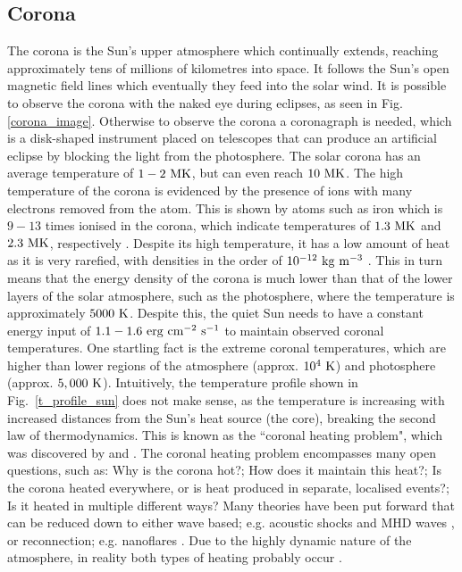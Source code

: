 \subsection{Corona}
\label{ssec:corona}
The corona is the Sun's upper atmosphere which continually extends, reaching approximately tens of millions of kilometres into space. It follows the Sun's open magnetic field lines which eventually they feed into the solar wind. It is possible to observe the corona with the naked eye during eclipses, as seen in Fig. \ref{corona_image}. Otherwise to observe the corona a coronagraph is needed, which is a disk-shaped instrument placed on telescopes that can produce an artificial eclipse by blocking the light from the photosphere. The solar corona has an average temperature of $1-2~\rm{MK}$, but can even reach $10~\rm{MK}$. The high temperature of the corona is evidenced by the presence of ions with many electrons removed from the atom. This is shown by atoms such as iron which is $9-13$ times ionised in the corona, which indicate temperatures of $1.3~\rm{MK}$ and $2.3~\rm{MK}$, respectively \citep{Grotrian1939,Edl1943}. Despite its high temperature, it has a low amount of heat as it is very rarefied, with densities in the order of $10^{-12}~\rm{kg~m^{-3}}$ \citep{priest2014magnetohydrodynamics}. This in turn means that the energy density of the corona is much lower than that of the lower layers of the solar atmosphere, such as the photosphere, where the temperature is approximately $5000~\rm{K}$. Despite this, the quiet Sun needs to have a constant energy input of $1.1-1.6~\rm{erg~cm^{-2}~s^{-1}}$ \citep{Sakurai2017PJAB9387S} to maintain observed coronal temperatures. \np
%
One startling fact is the extreme coronal temperatures, which are higher than lower regions of the atmosphere (approx. $10^4~\rm{K}$) and photosphere (approx. $5,000~\rm{K}$). Intuitively, the temperature profile shown in Fig.~\ref{t_profile_sun} does not make sense, as the temperature is increasing with increased distances from the Sun's heat source (the core), breaking the second law of thermodynamics. This is known as the ``coronal heating problem", which was discovered by \cite{Grotrian1939} and \cite{Edl1943}. The coronal heating problem encompasses many open questions, such as: Why is the corona hot?; How does it maintain this heat?; Is the corona heated everywhere, or is heat produced in separate, localised events?; Is it heated in multiple different ways? Many theories have been put forward that can be reduced down to either wave based; e.g. acoustic shocks and MHD waves \citep{Alfv1947MNRAS107211A, Uchida1974SoPh35451U, Wentzel1974SoPh39129W, Priest1998Natur393545P, Hollweg1982ApJ254806H, Antolin2008IAUS247279A, Escande2019NatSR914274E}, or reconnection; e.g. nanoflares \citep{Parker1988ApJ330474P, Cargill1993SoPh147263C, Parnell2000ApJ529554P, Klimchuk2001ApJ553440K,  Cargill2004ApJ605911C, Antolin2021NatAs554A}. Due to the highly dynamic nature of the atmosphere, in reality both types of heating probably occur \citep{Zirker1993SoPh14843Z,Parnell2012RSPTA3703217P}. \np
